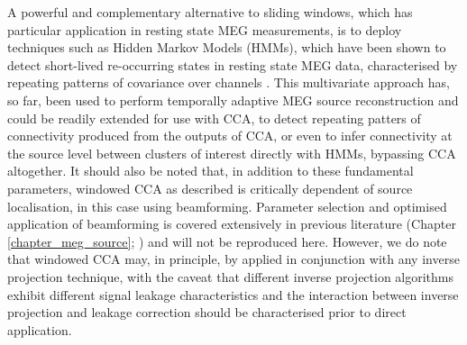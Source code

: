 A powerful and complementary alternative to sliding windows, which has particular application in resting state MEG measurements, is to deploy techniques such as Hidden Markov Models (HMMs), which have been shown to detect short-lived re-occurring states in resting state MEG data, characterised by repeating patterns of covariance over channels \citep{Woolrich2013,Baker2014}. This multivariate approach has, so far, been used to perform temporally adaptive MEG source reconstruction and could be readily extended for use with CCA, to detect repeating patters of connectivity produced from the outputs of CCA, or even to infer connectivity at the source level between clusters of interest directly with HMMs, bypassing CCA altogether. It should also be noted that, in addition to these fundamental parameters, windowed CCA as described is critically dependent of source localisation, in this case using beamforming. Parameter selection and optimised application of beamforming is covered extensively in previous literature (Chapter \ref{chapter_meg_source}; \citealp{Brookes2008}) and will not be reproduced here. However, we do note that windowed CCA may, in principle, by applied in conjunction with any inverse projection technique, with the caveat that different inverse projection algorithms exhibit different signal leakage characteristics and the interaction between inverse projection and leakage correction should be characterised prior to direct application.

